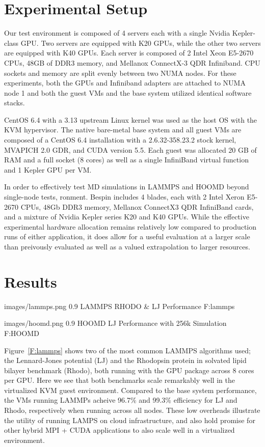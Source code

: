 \documentclass[times,10pt,twocolumn,conference]{IEEEtran}
\begin{document}
\section{Experimental Setup}

Our test environment is composed of 4 servers each with a single Nvidia Kepler-class GPU.  Two servers are equipped with K20 GPUs, while the other two servers are equipped with K40 GPUs.  Each server is composed of 2 Intel Xeon E5-2670 CPUs, 48GB of DDR3 memory, and Mellanox ConnectX-3 QDR Infiniband.  CPU sockets and memory are split evenly between two NUMA nodes.  For these experiments, both the GPUs and Infiniband adapters are attached to NUMA node 1 and both the guest VMs and the base system utilized identical software stacks.   

CentOS 6.4 with a 3.13 upstream Linux kernel was used as the host OS with the KVM hypervisor.  The native bare-metal base system and all guest VMs are composed of a CentOS 6.4 installation with a 2.6.32-358.23.2 stock kernel, MVAPICH 2.0 GDR, and CUDA version 5.5. Each guest was allocated 20 GB of RAM and a full socket (8 cores) as well as a single InfiniBand virtual function  and 1 Kepler GPU per VM.  

In order to effectively test MD simulations in LAMMPS and HOOMD beyond single-node tests, ronment.  Bespin includes 4 blades, each with 2 Intel Xeron E5-2670 CPUs, 48Gb DDR3 memory, Mellanox ConnectX3 QDR InfiniBand cards, and a mixture of Nvidia Kepler series K20 and K40 GPUs.  While the effective experimental hardware allocation remains relatively low compared to production runs of either application, it does allow for a useful evaluation at a larger scale than preivously evaluated as well as a valued extrapolation to larger resources.
 
\section{Results}



  {images/lammps.png}
  {0.9}
  {LAMMPS RHODO \& LJ Performance}
  {F:lammps}


  {images/hoomd.png}
  {0.9}
  {HOOMD LJ Performance with 256k Simulation}
  {F:HOOMD}

Figure~\ref{F:lammps} shows two of the most common LAMMPS algorithms used; the Lennard-Jones potential (LJ) and the Rhodopsin protein in solvated lipid bilayer benchmark (Rhodo), both running with the GPU package across 8 cores per GPU. Here we see that both benchmarks scale remarkably well in the virtualized KVM guest environment. 
Compared to the base system performance, the VMs running LAMMPs acheive 96.7\% and 99.3\% efficiency for LJ and Rhodo, respectively when running across all nodes.  These low overheads illustrate the utility of running LAMPS on cloud infrastructure, and also hold promise for other hybrid MPI + CUDA applications to also scale well in a virtualized environment. 
\end{document}
